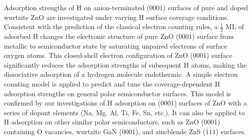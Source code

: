 Adsorption strengths of H on anion-terminated (000$\overline{1}$) surfaces of pure and doped wurtzite ZnO are investigated under varying H surface coverage conditions. Consistent with the prediction of the classical electron counting rules, a $\frac{1}{2}$ \ac{ML} of adsorbed H changes the electronic structure of pure ZnO (000$\overline{1}$) surface from metallic to semiconductor state by saturating unpaired electrons of surface oxygen atoms. This closed-shell electron configuration of ZnO (000$\overline{1}$) surface significantly reduces the adsorption strengths of subsequent H atoms, making the dissociative adsorption of a hydrogen molecule endothermic. A simple electron counting model is applied to predict and tune the coverage-dependent H adsorption strengths on general polar semiconductor surfaces. This model is confirmed by our investigations of H adsorption on (000$\overline{1}$) surfaces of ZnO with a series of dopant elements (Na, Mg, Al, Ti, Fe, Sn, etc.). It can also be applied to H adsorption on other similar polar semiconductors, such as ZnO (000$\bar{1}$) containing O vacancies, wurtzite GaN  (000$\overline{1}$), and zincblende ZnS ($\overline{1}$$\overline{1}$$\overline{1}$) surfaces.






